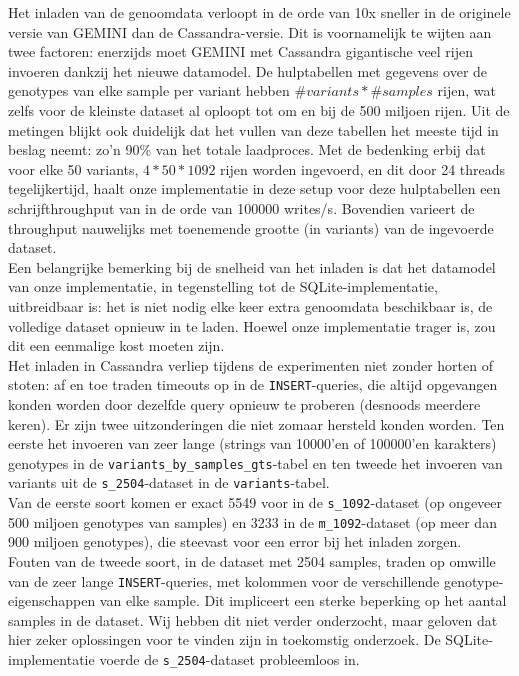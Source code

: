 Het inladen van de genoomdata verloopt in de orde van 10x sneller in de originele versie van GEMINI dan de Cassandra-versie. Dit is voornamelijk te wijten aan twee factoren: enerzijds moet GEMINI met Cassandra gigantische veel rijen invoeren dankzij het nieuwe datamodel. De hulptabellen met gegevens over de genotypes van elke sample per variant hebben $\#variants * \#samples$ rijen, wat zelfs voor de kleinste dataset al oploopt tot om en bij de 500 miljoen rijen. Uit de metingen blijkt ook duidelijk dat het vullen van deze tabellen het meeste tijd in beslag neemt: zo'n 90\% van het totale laadproces. Met de bedenking erbij dat voor elke 50 variants, $4 * 50 * 1092$ rijen worden ingevoerd, en dit door 24 threads tegelijkertijd, haalt onze implementatie in deze setup voor deze hulptabellen een schrijfthroughput van in de orde van 100000 writes/s. Bovendien varieert de throughput nauwelijks met toenemende grootte (in variants) van de ingevoerde dataset.\\
Een belangrijke bemerking bij de snelheid van het inladen is dat het datamodel van onze implementatie, in tegenstelling tot de SQLite-implementatie, uitbreidbaar is: het is niet nodig elke keer extra genoomdata beschikbaar is, de volledige dataset opnieuw in te laden. Hoewel onze implementatie trager is, zou dit een eenmalige kost moeten zijn.\\

Het inladen in Cassandra verliep tijdens de experimenten niet zonder horten of stoten: af en toe traden timeouts op in de \texttt{INSERT}-queries, die altijd opgevangen konden worden door dezelfde query opnieuw te proberen (desnoods meerdere keren). Er zijn twee uitzonderingen die niet zomaar hersteld konden worden. Ten eerste het invoeren van zeer lange (strings van 10000'en of 100000'en karakters) genotypes in de \texttt{variants\_by\_samples\_gts}-tabel en ten tweede het invoeren van variants uit de \texttt{s\_2504}-dataset in de \texttt{variants}-tabel.\\
Van de eerste soort komen er exact 5549 voor in de \texttt{s\_1092}-dataset (op ongeveer 500 miljoen genotypes van samples) en 3233 in de \texttt{m\_1092}-dataset (op meer dan 900 miljoen genotypes), die steevast voor een error bij het inladen zorgen.\\
Fouten van de tweede soort, in de dataset met 2504 samples, traden op omwille van de zeer lange \texttt{INSERT}-queries, met kolommen voor de verschillende genotype-eigenschappen van elke sample. Dit impliceert een sterke beperking op het aantal samples in de dataset. Wij hebben dit niet verder onderzocht, maar geloven dat hier zeker oplossingen voor te vinden zijn in toekomstig onderzoek. De SQLite-implementatie voerde de \texttt{s\_2504}-dataset probleemloos in.

